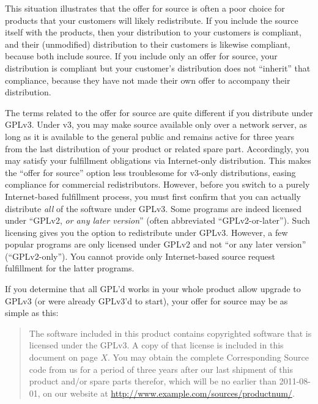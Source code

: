 This situation illustrates that the offer for source is often a poor
choice for products that your customers will likely redistribute.  If you
include the source itself with the products, then your distribution to
your customers is compliant, and their (unmodified) distribution to their
customers is likewise compliant, because both include source.  If you
include only an offer for source, your distribution is compliant but your
customer's distribution does not ``inherit'' that compliance, because they
have not made their own offer to accompany their distribution.

The terms related to the offer for source are quite different if you
distribute under GPLv3.  Under v3, you may make source available only over
a network server, as long as it is available to the general public and
remains active for three years from the last distribution of your product
or related spare part.  Accordingly, you may satisfy your fulfillment
obligations via Internet-only distribution.  This makes the ``offer for
source'' option less troublesome for v3-only distributions, easing
compliance for commercial redistributors.  However, before you switch to a
purely Internet-based fulfillment process, you must first confirm that you
can actually distribute \emph{all} of the software under GPLv3.  Some
programs are indeed licensed under ``GPLv2, \emph{or any later version}''
(often abbreviated ``GPLv2-or-later'').  Such licensing gives you the
option to redistribute under GPLv3.  However, a few popular programs are
only licensed under GPLv2 and not ``or any later version''
(``GPLv2-only'').  You cannot provide only Internet-based source request
fulfillment for the latter programs.

If you determine that all GPL'd works in your whole product allow upgrade
to GPLv3 (or were already GPLv3'd to start), your offer for source may be
as simple as this:

\begin{quote}
The software included in this product contains copyrighted software that
is licensed under the GPLv3\@.  A copy of that license is included in this
document on page $X$\@.  You may obtain the complete Corresponding Source
code from us for a period of three years after our last shipment of this
product and/or spare parts therefor, which will be no earlier than
2011-08-01, on our website at
\url{http://www.example.com/sources/productnum/}.
\end{quote}

\medskip

